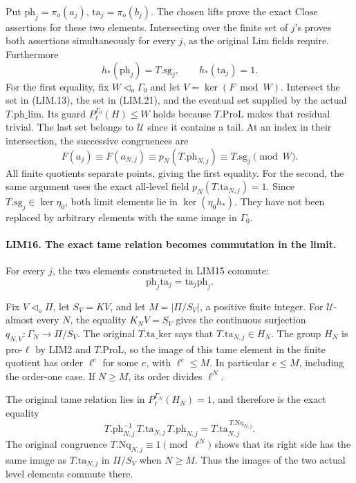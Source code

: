 Put \(\mathrm{ph}_j=\pi_o(a_j)\),
\(\mathrm{ta}_j=\pi_o(b_j)\).  The chosen lifts prove the exact
\(\mathrm{Close}\) assertions for these two elements.
Intersecting over the finite set of \(j\)'s proves both assertions
simultaneously for every \(j\), as the original \(\mathrm{Lim}\)
fields require.
Furthermore
\[
 h_*(\mathrm{ph}_j)=T.\mathrm{sg}_j,
 \qquad h_*(\mathrm{ta}_j)=1.
 \tag{LIM.22}
\]
For the first equality, fix \(W\triangleleft_o\Gamma_0\) and let
\(V=\ker(F\bmod W)\).
Intersect the set in (LIM.13), the set in (LIM.21), and the
eventual set supplied by the actual \(T.\mathrm{ph\_lim}\).
Its guard \(P_\ell^{\Gamma_0}(H)\le W\) holds because
\(T.\mathrm{ProL}\) makes that residual trivial.
The last set belongs to \(\mathcal U\) since it contains a tail.
At an index in their intersection, the successive congruences are
\[
 F(a_j)\equiv F(a_{N,j})
       \equiv p_N(T.\mathrm{ph}_{N,j})
       \equiv T.\mathrm{sg}_j\pmod W.
\]
All finite quotients separate points, giving the first equality.
For the second, the same argument uses the exact all-level field
\(p_N(T.\mathrm{ta}_{N,j})=1\).
Since \(T.\mathrm{sg}_j\in\ker\eta_0\), both limit elements lie
in \(\ker(\eta_0h_*)\).  They have not been replaced by arbitrary
elements with the same image in \(\Gamma_0\).

\paragraph{LIM16. The exact tame relation becomes commutation in the limit.}
\label{claim:LIM16}
For every \(j\), the two elements constructed in LIM15 commute:
\[
 \mathrm{ph}_j\mathrm{ta}_j
       =\mathrm{ta}_j\mathrm{ph}_j.
 \tag{LIM.23}
\]

Fix \(V\triangleleft_o\Pi\), let \(S_V=KV\), and let
\(M=|\Pi/S_V|\), a positive finite integer.
For \(\mathcal U\)-almost every \(N\), the equality
\(K_NV=S_V\) gives the continuous surjection
\(q_{N,V}:\Gamma_N\to\Pi/S_V\).
The original \(T.\mathrm{ta\_ker}\) says that
\(T.\mathrm{ta}_{N,j}\in H_N\).
The group \(H_N\) is pro-\(\ell\) by LIM2 and
\(T.\mathrm{ProL}\), so the image of this tame element in the
finite quotient has order \(\ell^e\) for some \(e\), with
\(\ell^e\le M\).  In particular \(e\le M\), including the
order-one case.  If \(N\ge M\), its order divides \(\ell^N\).

The original tame relation lies in
\(P_\ell^{\Gamma_N}(H_N)=1\), and therefore is the exact equality
\[
 T.\mathrm{ph}_{N,j}^{-1}\,T.\mathrm{ta}_{N,j}\,
 T.\mathrm{ph}_{N,j}
       =T.\mathrm{ta}_{N,j}^{\,T.\mathrm{Nq}_{N,j}}.
 \tag{LIM.24}
\]
The original congruence
\(T.\mathrm{Nq}_{N,j}\equiv1\pmod{\ell^N}\)
shows that its right side has the same image as
\(T.\mathrm{ta}_{N,j}\) in \(\Pi/S_V\) when \(N\ge M\).
Thus the images of the two actual level elements commute there.

